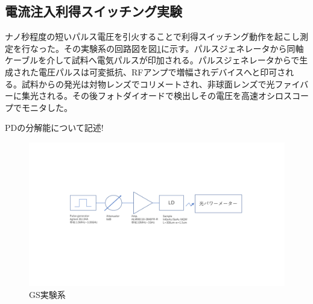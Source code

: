 \subsection{電流注入利得スイッチング実験}%
ナノ秒程度の短いパルス電圧を引火することで利得スイッチング動作を起こし測定を行なった。その実験系の回路図を図\ref{fig:GS_setup}に示す。パルスジェネレータから同軸ケーブルを介して試料へ電気パルスが印加される。パルスジェネレータからで生成された電圧パルスは可変抵抗、RFアンプで増幅されデバイスへと印可される。試料からの発光は対物レンズでコリメートされ、非球面レンズで光ファイバーに集光される。その後フォトダイオードで検出しその電圧を高速オシロスコープでモニタした。

PDの分解能について記述!
\begin{figure}[htbp]
	\includegraphics[width=15cm]{figure/fig_2_3_1_01_GS_setup.pdf}
	\caption{GS実験系}
	\label{fig:GS_setup}
\end{figure}


